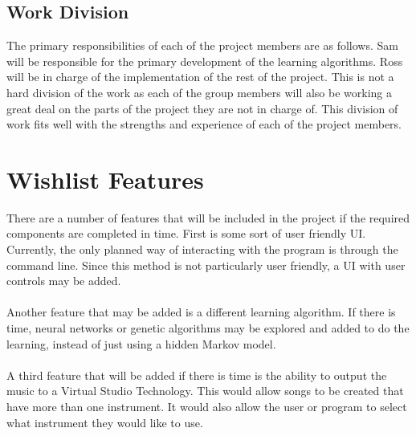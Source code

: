 \documentclass{article}
\begin{document}
\subsection{Work Division}
The primary responsibilities of each of the project members are as follows. Sam will be responsible for the primary development of the learning algorithms. Ross will be in charge of the implementation of the rest of the project. This is not a hard division of the work as each of the group members will also be working a great deal on the parts of the project they are not in charge of. This division of work fits well with the strengths and experience of each of the project members.


\section{Wishlist Features}
There are a number of features that will be included in the project if the required components are completed in time. First is some sort of user friendly UI. Currently, the only planned way of interacting with the program is through the command line. Since this method is not particularly user friendly, a UI with user controls may be added.\\
\\
Another feature that may be added is a different learning algorithm. If there is time, neural networks or genetic algorithms may be explored and added to do the learning, instead of just using a hidden Markov model.\\
\\
A third feature that will be added if there is time is the ability to output the music to a Virtual Studio Technology. This would allow songs to be created that have more than one instrument. It would also allow the user or program to select what instrument they would like to use.

\nocite{*}



\end{document}

